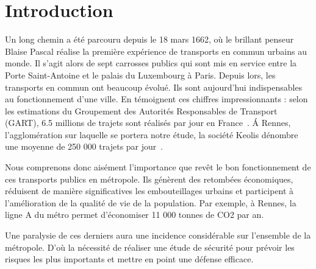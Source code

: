 \section{Introduction}

Un long chemin a été parcouru depuis le 18 mars 1662, où le brillant penseur Blaise Pascal réalise la première expérience de transports en commun urbains au monde. Il s'agit alors de sept carrosses publics qui sont mis en service entre la Porte Saint-Antoine et le palais du Luxembourg à Paris. Depuis lors, les transports en commun ont beaucoup évolué. Ils sont aujourd'hui indispensables au fonctionnement d'une ville. En témoignent ces chiffres impressionnants : selon les estimations du Groupement des Autorités Responsables de Transport (GART), 6.5 millions de trajets sont réalisés par jour en France~\cite{Gart}. \'A Rennes, l'agglomération sur laquelle se portera notre étude, la société Keolis dénombre une moyenne de 250 000 trajets par jour~\cite{Keolis}. 

Nous comprenons donc aisément l'importance que revêt le bon fonctionnement de ces transports publics en métropole. Ils génèrent des retombées économiques, réduisent de manière significatives les embouteillages urbains et participent à l’amélioration de la qualité de vie de la population. Par exemple, à Rennes, la ligne A du métro permet d'économiser 11 000 tonnes de CO2 par an. \cite{bilanLA}

Une paralysie de ces derniers aura une incidence considérable sur l'ensemble de la métropole. D’où la nécessité de réaliser une étude de sécurité pour prévoir les risques les plus importants et mettre en point une défense efficace. 


























